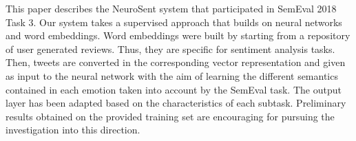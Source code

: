 This paper describes the NeuroSent system that participated in SemEval 2018 Task 3. Our system takes a supervised approach that builds on neural networks and word embeddings. Word embeddings were built by starting from a repository of user generated reviews. Thus, they are specific for sentiment analysis tasks. Then, tweets are converted in the corresponding vector representation and given as input to the neural network with the aim of learning the different semantics contained in each emotion taken into account by the SemEval task. The output layer has been adapted based on the characteristics of each subtask. Preliminary results obtained on the provided training set are encouraging for pursuing the investigation into this direction.
